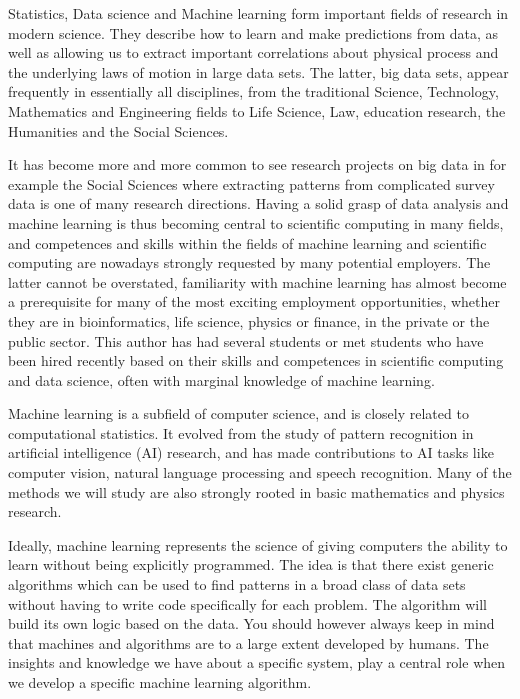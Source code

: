 \documentclass[%
oneside,                 %
final,                   %
10pt]{article}
\begin{document}
Statistics, Data science and Machine learning form important
fields of research in modern science.  They describe how to learn and
make predictions from data, as well as allowing us to extract
important correlations about physical process and the underlying laws
of motion in large data sets. The latter, big data sets, appear
frequently in essentially all disciplines, from the traditional
Science, Technology, Mathematics and Engineering fields to Life
Science, Law, education research, the Humanities and the Social
Sciences.

It has become more
and more common to see research projects on big data in for example
the Social Sciences where extracting patterns from complicated survey
data is one of many research directions.  Having a solid grasp of data
analysis and machine learning is thus becoming central to scientific
computing in many fields, and competences and skills within the fields
of machine learning and scientific computing are nowadays strongly
requested by many potential employers. The latter cannot be
overstated, familiarity with machine learning has almost become a
prerequisite for many of the most exciting employment opportunities,
whether they are in bioinformatics, life science, physics or finance,
in the private or the public sector. This author has had several
students or met students who have been hired recently based on their
skills and competences in scientific computing and data science, often
with marginal knowledge of machine learning.

Machine learning is a subfield of computer science, and is closely
related to computational statistics.  It evolved from the study of
pattern recognition in artificial intelligence (AI) research, and has
made contributions to AI tasks like computer vision, natural language
processing and speech recognition. Many of the methods we will study are also 
strongly rooted in basic mathematics and physics research. 

Ideally, machine learning represents the science of giving computers
the ability to learn without being explicitly programmed.  The idea is
that there exist generic algorithms which can be used to find patterns
in a broad class of data sets without having to write code
specifically for each problem. The algorithm will build its own logic
based on the data.  You should however always keep in mind that
machines and algorithms are to a large extent developed by humans. The
insights and knowledge we have about a specific system, play a central
role when we develop a specific machine learning algorithm. 
\end{document}

